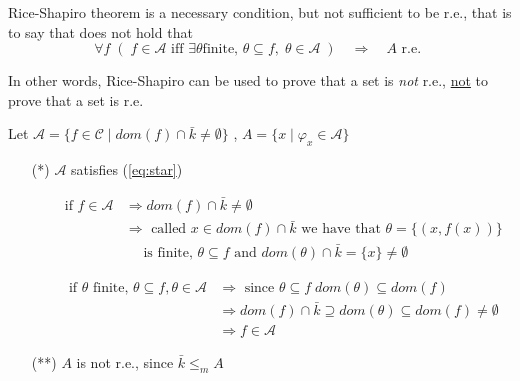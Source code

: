 \begin{observation}
  Rice-Shapiro theorem is a necessary condition, but not sufficient to
  be r.e., that is to say that does not hold that
  \begin{equation}\label{eq:star}
    \forall f \; (\; f \in \mathcal{A} \mbox{ iff } \exists \theta \mbox{
      finite, } \theta \subseteq f, \; \theta \in \mathcal{A} \; ) \quad
    \Rightarrow \quad A \mbox{ r.e. }
  \end{equation}

  In other words, Rice-Shapiro can be used to prove that a set is
  \emph{not} r.e., \underline{not} to prove that a set is r.e.
\end{observation}

\begin{counterexample}
  Let
  $\mathcal{A} = \{ f \in \mathcal{C} \mid dom(f) \cap \bar{k} \neq
  \emptyset\}$ , $A = \{x \mid \varphi_x \in \mathcal{A}\}$

  \begin{enumerate}
  \item[(*)] $\mathcal{A}$ satisfies (\ref{eq:star})
    \begin{itemize}
    \item[] \[
        \begin{aligned}
          \mbox{if } f \in \mathcal{A} & \Rightarrow dom(f) \cap \bar{k} \neq \emptyset \\
                                       & \Rightarrow \mbox{ called } x \in dom(f) \cap \bar{k} \mbox{ we have that } \theta = \{(x, f(x))\} \\
                                       & \quad \mbox{ is finite, } \theta \subseteq f \mbox{ and } dom(\theta)\cap \bar{k} = \{x\} \neq \emptyset
        \end{aligned}
      \]

    \item[] \[
        \begin{aligned}
          \mbox{if $\theta$ finite, } \theta \subseteq f, \theta \in \mathcal{A} & \Rightarrow \mbox{ since } \theta \subseteq f \; dom(\theta) \subseteq dom(f) \\
          & \Rightarrow dom(f) \cap \bar{k} \supseteq dom(\theta) \subseteq dom(f) \neq \emptyset \\
          & \Rightarrow f \in \mathcal{A}
        \end{aligned}
      \]
    \end{itemize}

  \item[(**)] $A$ is not r.e., since $\bar{k} \leq_m A$


\end{enumerate}
\end{counterexample}
